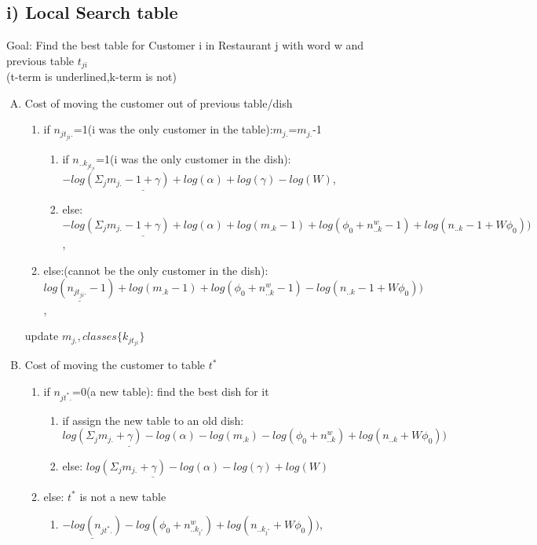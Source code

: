 \documentclass{article}
\begin{document}
\begin{spacing}{1.1}
\subsection{i) Local Search table}
Goal: Find the best table for Customer i in Restaurant j with word w and previous table $t_{ji}$\\
(t-term is underlined,k-term is not)
\begin{enumerate}[(A)]
 \item Cost of moving the customer out of previous table/dish
\begin{enumerate}
\item if $n_{jt_{ji}.}$=1(i was the only customer in the table):$m_{j.}$=$m_{j.}$-1
\begin{enumerate}
 \item if $n_{..k_{jt_{ji}}}$=1(i was the only customer in the dish):$\underline{-log(\Sigma_{j} m_{j.}-1+\gamma)+log(\alpha)}+log(\gamma)-log(W)$,
 \item else:$\underline{-log(\Sigma_{j} m_{j.}-1+\gamma)+log(\alpha)}+log(m_{.k}-1)+log(\phi_{0}+n_{..k}^{w}-1)+log(n_{..k}-1+W\phi_{0}))$,
\end{enumerate}
\item else:(cannot be the only customer in the dish):$\underline{log(n_{jt_{ji}.}-1)}+log(m_{.k}-1)+log(\phi_{0}+n_{..k}^{w}-1)-log(n_{..k}-1+W\phi_{0}))$,
\end{enumerate}
update $m_{j.},classes\{k_{jt_{ji}}\}$

\item Cost of moving the customer to table $t^{*}$
\begin{enumerate}
\item if $n_{jt^{*}.}$=0(a new table): find the best dish for it
\begin{enumerate}
 \item if assign the new table to an old dish: $\underline{log(\Sigma_{j} m_{j.}+\gamma)-log(\alpha)}-log(m_{.k})-log(\phi_{0}+n_{..k}^{w})+log(n_{..k}+W\phi_{0}))$
 \item else: $\underline{log(\Sigma_{j} m_{j.}+\gamma)-log(\alpha)}-log(\gamma)+log(W)$
\end{enumerate}
\item else: $t^{*}$ is not a new table
\begin{enumerate}
 \item $\underline{-log(n_{jt^{*}.})}-log(\phi_{0}+n_{..k_{t^{*}}}^{w})+log(n_{..k_{t^{*}}}+W\phi_{0}))$,
\end{enumerate}
\end{enumerate} 
\end{enumerate} 

\end{spacing}
\end{document}

